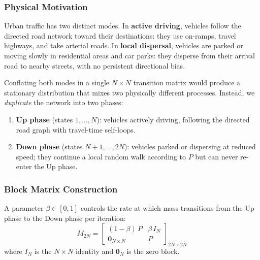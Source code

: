 \documentclass[12pt,a4paper]{article}
\theoremstyle{definition}
\theoremstyle{plain}
\begin{document}
\subsubsection{Physical Motivation}

Urban traffic has two distinct modes. In \textbf{active driving}, vehicles follow the
directed road network toward their destinations: they use on-ramps, travel highways, and
take arterial roads. In \textbf{local dispersal}, vehicles are parked or moving slowly
in residential areas and car parks: they disperse from their arrival road to nearby
streets, with no persistent directional bias.

Conflating both modes in a single $N \times N$ transition matrix would produce a
stationary distribution that mixes two physically different processes. Instead, we
\emph{duplicate} the network into two phases:

\begin{enumerate}[label=\textbf{\arabic*.}]
  \item \textbf{Up phase} (states $1,\ldots,N$): vehicles actively driving, following
    the directed road graph with travel-time self-loops.
  \item \textbf{Down phase} (states $N+1,\ldots,2N$): vehicles parked or dispersing at
    reduced speed; they continue a local random walk according to $P$ but can never
    re-enter the Up phase.
\end{enumerate}

\subsubsection{Block Matrix Construction}

A parameter $\beta \in [0,1]$ controls the rate at which mass transitions from the Up
phase to the Down phase per iteration:
\begin{equation}
  \boxed{M_{2N} =
  \begin{bmatrix}
    (1-\beta)\,P & \beta\,I_N \\[4pt]
    \mathbf{0}_{N\times N} & P
  \end{bmatrix}_{2N \times 2N}}
  \label{eq:block}
\end{equation}
where $I_N$ is the $N \times N$ identity and $\mathbf{0}_N$ is the zero block.
\end{document}
